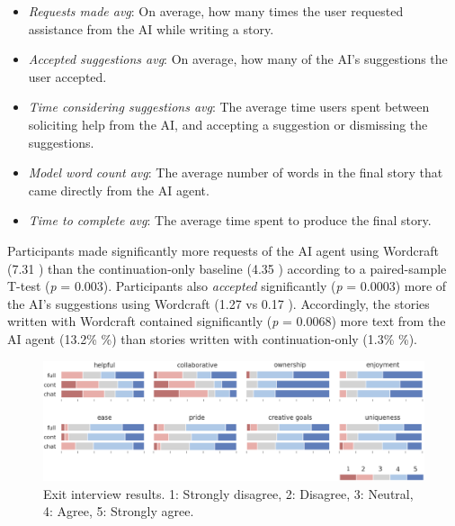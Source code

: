 \begin{itemize}
    \item \textit{Requests made avg}: On average, how many times the user requested assistance from the AI while writing a story.
    \item \textit{Accepted suggestions avg}: On average, how many of the AI's suggestions the user accepted.
    \item \textit{Time considering suggestions avg}: The average time users spent between soliciting help from the AI, and accepting a suggestion or dismissing the suggestions.
    \item \textit{Model word count avg}: The average number of words in the final story that came directly from the AI agent.
    \item \textit{Time to complete avg}: The average time spent to produce the final story.
\end{itemize}


Participants made significantly more requests of the AI agent using Wordcraft (7.31 ) than the continuation-only baseline (4.35 ) according to a paired-sample T-test (\textit{p} = 0.003). Participants also \textit{accepted} significantly (\textit{p} = 0.0003) more of the AI's suggestions using Wordcraft (1.27  vs 0.17 ). Accordingly, the stories written with Wordcraft contained significantly (\textit{p} = 0.0068) more text from the AI agent (13.2\% \%) than stories written with continuation-only (1.3\% \%).



\begin{figure}[tbp]
  \centering
  \includegraphics[width=\linewidth]{figures/exit_interview_results.png}
  \caption{Exit interview results. 1: Strongly disagree, 2: Disagree, 3: Neutral, 4: Agree, 5: Strongly agree.}
  \label{fig:exit_interview_results}
\end{figure}


